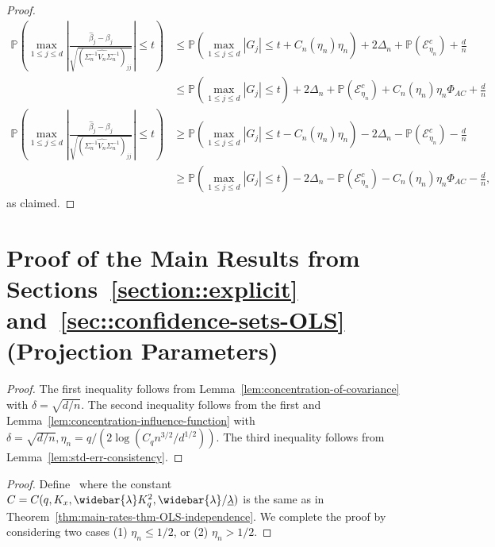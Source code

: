 \documentclass{article}
\begin{document}
\begin{appendices}
\begin{proof}
\begin{align*}
\mathbb{P}\left(\max_{1\le j\le d}\left|\frac{\widehat{\beta}_j - \beta_j}{\sqrt{(\widehat{\Sigma_n^{-1}V_n\Sigma_n^{-1}})_{jj}}}\right| \le t\right) &\le \mathbb{P}\left(\max_{1\le j\le d}|G_j| \le t + C_n(\eta_n)\eta_n\right) + 2\Delta_n + \mathbb{P}(\mathcal{E}_{\eta_n}^c) + \frac{d}{n}\\ &\le \mathbb{P}\left(\max_{1\le j\le d}|G_j| \le t\right) + 2\Delta_n + \mathbb{P}(\mathcal{E}_{\eta_n}^c) + C_n(\eta_n)\eta_n \Phi_{AC} + \frac{d}{n}\\ \mathbb{P}\left(\max_{1\le j\le d}\left|\frac{\widehat{\beta}_j - \beta_j}{\sqrt{(\widehat{\Sigma_n^{-1}V_n\Sigma_n^{-1}})_{jj}}}\right| \le t\right) &\ge \mathbb{P}\left(\max_{1\le j\le d}|G_j| \le t - C_n(\eta_n)\eta_n\right) - 2\Delta_n - \mathbb{P}(\mathcal{E}_{\eta_n}^c) - \frac{d}{n}\\ &\ge \mathbb{P}\left(\max_{1\le j\le d}|G_j| \le t\right) - 2\Delta_n - \mathbb{P}(\mathcal{E}_{\eta_n}^c) - C_n(\eta_n)\eta_n \Phi_{AC} - \frac{d}{n},
\end{align*}
as claimed.
\end{proof}
\section{Proof of the Main Results from Sections~\ref{section::explicit} and~\ref{sec::confidence-sets-OLS} (Projection Parameters)}
\label{appendix:main.ols}
\begin{proof}
The first inequality follows from Lemma~\ref{lem:concentration-of-covariance} with $\delta = \sqrt{d/n}$. The second inequality follows from the first and Lemma~\ref{lem:concentration-influence-function} with $\delta = \sqrt{d/n}, \eta_n = q/(2\log(C_qn^{3/2}/d^{1/2}))$. The third inequality follows from Lemma~\ref{lem:std-err-consistency}.
\end{proof}
\begin{proof}
Define
\,
\]
where the constant $C = C(q, K_x, \widebar{\lambda}K_q^2, \widebar{\lambda}/\underline{\lambda})$ is the same as in Theorem~\ref{thm:main-rates-thm-OLS-independence}.
We complete the proof by considering two cases (1) $\eta_n \le 1/2$, or (2) $\eta_n > 1/2$.

\end{proof}
\end{appendices}
\end{document}
